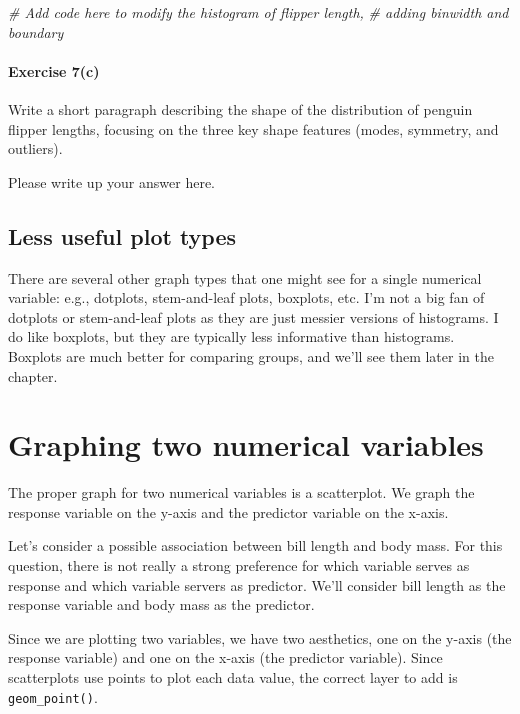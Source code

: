 \documentclass[
]{book}
\newenvironment{Shaded}{\begin{snugshade}}{\end{snugshade}}
\newcommand{\CommentTok}[1]{\textcolor[rgb]{0.56,0.35,0.01}{\textit{#1}}}
\begin{document}
\begin{Shaded}
\begin{Highlighting}[]
\CommentTok{\# Add code here to modify the histogram of flipper length,}
\CommentTok{\# adding binwidth and boundary}
\end{Highlighting}
\end{Shaded}

\hypertarget{exercise-7c-1}{%
\paragraph*{Exercise 7(c)}\label{exercise-7c-1}}

Write a short paragraph describing the shape of the distribution of penguin flipper lengths, focusing on the three key shape features (modes, symmetry, and outliers).

Please write up your answer here.

\hypertarget{numerical-less-useful}{%
\subsection{Less useful plot types}\label{numerical-less-useful}}

There are several other graph types that one might see for a single numerical variable: e.g., dotplots, stem-and-leaf plots, boxplots, etc. I'm not a big fan of dotplots or stem-and-leaf plots as they are just messier versions of histograms. I do like boxplots, but they are typically less informative than histograms. Boxplots are much better for comparing groups, and we'll see them later in the chapter.

\hypertarget{numerical-graphing-two}{%
\section{Graphing two numerical variables}\label{numerical-graphing-two}}

The proper graph for two numerical variables is a scatterplot. We graph the response variable on the y-axis and the predictor variable on the x-axis.

Let's consider a possible association between bill length and body mass. For this question, there is not really a strong preference for which variable serves as response and which variable servers as predictor. We'll consider bill length as the response variable and body mass as the predictor.

Since we are plotting two variables, we have two aesthetics, one on the y-axis (the response variable) and one on the x-axis (the predictor variable). Since scatterplots use points to plot each data value, the correct layer to add is \texttt{geom\_point()}.
\end{document}
